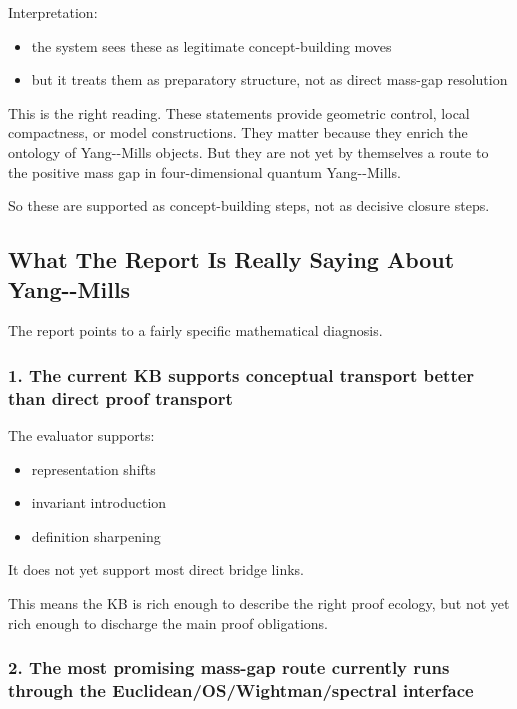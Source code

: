 \documentclass[
]{article}
\providecommand{\tightlist}{%
  \setlength{\itemsep}{0pt}\setlength{\parskip}{0pt}}
\begin{document}
Interpretation:

\begin{itemize}
\tightlist
\item
  the system sees these as legitimate concept-building moves
\item
  but it treats them as preparatory structure, not as direct mass-gap
  resolution
\end{itemize}

This is the right reading. These statements provide geometric control,
local compactness, or model constructions. They matter because they
enrich the ontology of Yang-\/-Mills objects. But they are not yet by
themselves a route to the positive mass gap in four-dimensional quantum
Yang-\/-Mills.

So these are supported as concept-building steps, not as decisive
closure steps.

\subsection{What The Report Is Really Saying About
Yang-\/-Mills}\label{what-the-report-is-really-saying-about-yang--mills}

The report points to a fairly specific mathematical diagnosis.

\subsubsection{1. The current KB supports conceptual transport better
than direct proof
transport}\label{1-the-current-kb-supports-conceptual-transport-better-than-direct-proof-transport}

The evaluator supports:

\begin{itemize}
\tightlist
\item
  representation shifts
\item
  invariant introduction
\item
  definition sharpening
\end{itemize}

It does not yet support most direct bridge links.

This means the KB is rich enough to describe the right proof ecology,
but not yet rich enough to discharge the main proof obligations.

\subsubsection{2. The most promising mass-gap route currently runs
through the Euclidean/OS/Wightman/spectral
interface}\label{2-the-most-promising-mass-gap-route-currently-runs-through-the-euclideanoswightmanspectral-interface}
\end{document}
